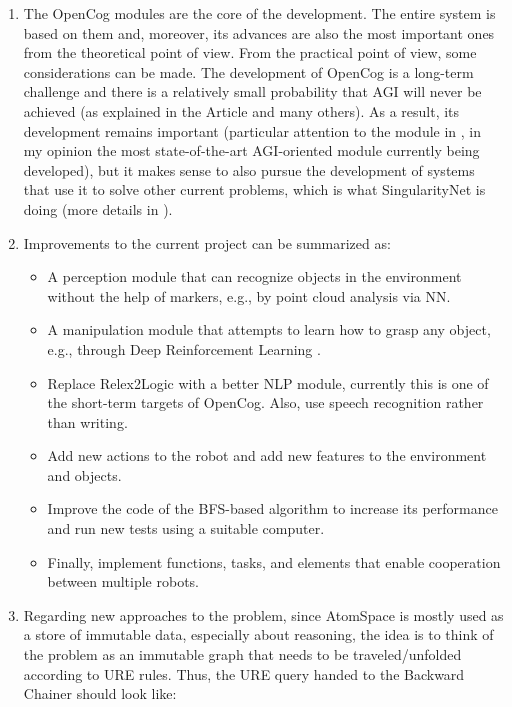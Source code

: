 \begin{enumerate}
	\item The OpenCog modules are the core of the development. The entire system is based on them and, moreover, its advances are also the most important ones from the theoretical point of view. From the practical point of view, some considerations can be made. The development of OpenCog is a long-term challenge and there is a relatively small probability that AGI will never be achieved (as explained in the Article \cite{hollander_2021} and many others). 
As a result, its development remains important (particular attention to the module in \cite{linas_learn}, in my opinion the most state-of-the-art AGI-oriented module currently being developed), but it makes sense to also pursue the development of systems that use it to solve other current problems, which is what SingularityNet is doing (more details in \cite{kolonin_2018}). 

	\item Improvements to the current project can be summarized as:

	\begin{itemize}
		\item A perception module that can recognize objects in the environment without the help of markers, e.g., by point cloud analysis via NN.

		\item A manipulation module that attempts to learn how to grasp any object, e.g., through Deep Reinforcement Learning \cite{DBLP:journals/corr/abs-2007-04499}.

		\item Replace Relex2Logic with a better NLP module, currently this is one of the short-term targets of OpenCog. Also, use speech recognition rather than writing.

		\item Add new actions to the robot and add new features to the environment and objects.

		\item Improve the code of the BFS-based algorithm to increase its performance and run new tests using a suitable computer.

		\item Finally, implement functions, tasks, and elements that enable cooperation between multiple robots.
	\end{itemize}

	\item Regarding new approaches to the problem, since AtomSpace is mostly used as a store of immutable data, especially about reasoning, the idea is to think of the problem as an immutable graph that needs to be traveled/unfolded according to URE rules. Thus, the URE query handed to the Backward Chainer should look like:


\end{enumerate}
